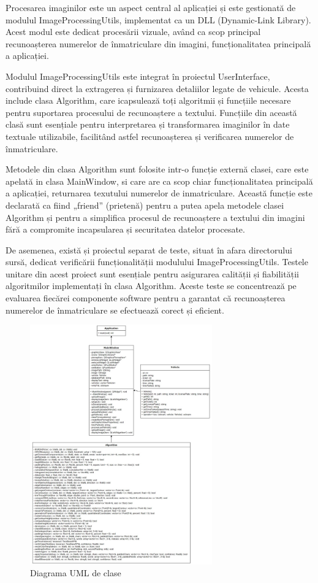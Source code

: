 \documentclass[a4paper,12pt]{report}
\begin{document}
Procesarea imaginilor este un aspect central al aplicației și este gestionată de modulul ImageProcessingUtils, implementat ca un DLL (Dynamic-Link Library). Acest modul este dedicat procesării vizuale, având ca scop principal recunoașterea numerelor de înmatriculare din imagini, funcționalitatea principală a aplicației.

Modulul ImageProcessingUtils este integrat în proiectul UserInterface, contribuind direct la extragerea și furnizarea detaliilor legate de vehicule. Acesta include clasa Algorithm, care icapsulează toți algoritmii și funcțiile necesare pentru suportarea procesului de recunoaștere a textului. Funcțiile din această clasă sunt esențiale pentru interpretarea și transformarea imaginilor în date textuale utilizabile, facilitând astfel recunoașterea și verificarea numerelor de înmatriculare.

Metodele din clasa Algorithm sunt folosite intr-o funcție externă clasei, care este apelată in clasa MainWindow, si care are ca scop chiar funcționalitatea principală a aplicației, returnarea texutului numerelor de inmatriculare. Această funcție este declarată ca fiind „friend” (prietenă) pentru a putea apela metodele clasei Algorithm și pentru a simplifica procesul de recunoaștere a textului din imagini fără a compromite incapsularea și securitatea datelor procesate.

De asemenea, există și proiectul separat de teste, situat în afara directorului sursă, dedicat verificării funcționalității modulului ImageProcessingUtils. Testele unitare din acest proiect sunt esențiale pentru asigurarea calității și fiabilității algoritmilor implementați în clasa Algorithm. Aceste teste se concentrează pe evaluarea fiecărei componente software pentru a garantat că recunoașterea numerelor de înmatriculare se efectuează corect și eficient.

\begin{figure}[h!]
    \centering
    \includegraphics[width=0.7\textwidth]{images/UML.jpg}
    \caption{Diagrama UML de clase}
\end{figure}
\FloatBarrier
\end{document}
